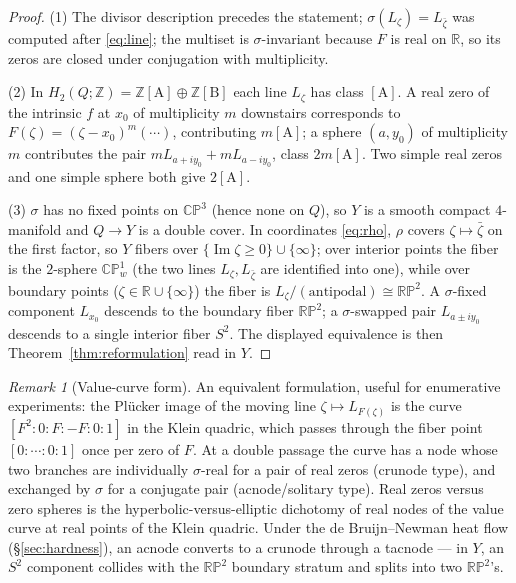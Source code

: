 \documentclass[11pt]{amsart}
\theoremstyle{plain}
\theoremstyle{definition}
\theoremstyle{remark}
\newtheorem{remark}[theorem]{Remark}
\newcommand{\RR}{\mathbb{R}}
\newcommand{\ZZ}{\mathbb{Z}}
\newcommand{\CP}{\mathbb{CP}}
\newcommand{\RP}{\mathbb{RP}}
\newcommand{\im}{\operatorname{Im}}
\begin{document}
\begin{proof}
(1) The divisor description precedes the statement; $\sigma(L_\zeta)=L_{\bar\zeta}$ was computed
after \eqref{eq:line}; the multiset is $\sigma$-invariant because $F$ is real on $\RR$, so its
zeros are closed under conjugation with multiplicity.

(2) In $H_2(Q;\ZZ)=\ZZ[\text{A}]\oplus\ZZ[\text{B}]$ each line $L_\zeta$ has class $[\text{A}]$. A
real zero of the intrinsic $f$ at $x_0$ of multiplicity $m$ downstairs corresponds to
$F(\zeta)=(\zeta-x_0)^m(\cdots)$, contributing $m[\text{A}]$; a sphere $(a,y_0)$ of multiplicity
$m$ contributes the pair $mL_{a+iy_0}+mL_{a-iy_0}$, class $2m[\text{A}]$. Two simple real zeros and
one simple sphere both give $2[\text{A}]$.

(3) $\sigma$ has no fixed points on $\CP^3$ (hence none on $Q$), so $Y$ is a smooth compact
$4$-manifold and $Q\to Y$ is a double cover. In coordinates \eqref{eq:rho}, $\rho$ covers
$\zeta\mapsto\bar\zeta$ on the first factor, so $Y$ fibers over
$\{\im\zeta\ge0\}\cup\{\infty\}$; over interior points the fiber is the $2$-sphere $\CP^1_w$ (the
two lines $L_\zeta,L_{\bar\zeta}$ are identified into one), while over boundary points
($\zeta\in\RR\cup\{\infty\}$) the fiber is $L_\zeta/(\text{antipodal})\cong\RP^2$. A
$\sigma$-fixed component $L_{x_0}$ descends to the boundary fiber $\RP^2$; a $\sigma$-swapped pair
$L_{a\pm iy_0}$ descends to a single interior fiber $S^2$. The displayed equivalence is then
Theorem~\ref{thm:reformulation} read in $Y$.
\end{proof}

\begin{remark}[Value-curve form]\label{rem:valuecurve}
An equivalent formulation, useful for enumerative experiments: the Pl\"ucker image of the moving
line $\zeta\mapsto L_{F(\zeta)}$ is the curve $[F^2:0:F:-F:0:1]$ in the Klein quadric, which
passes through the fiber point $[0:\cdots:0:1]$ once per zero of $F$. At a double passage the
curve has a node whose two branches are individually $\sigma$-real for a pair of real zeros
(crunode type), and exchanged by $\sigma$ for a conjugate pair (acnode/solitary type). Real zeros
versus zero spheres is the hyperbolic-versus-elliptic dichotomy of real nodes of the value curve
at real points of the Klein quadric. Under the de Bruijn--Newman heat flow (\S\ref{sec:hardness}),
an acnode converts to a crunode through a tacnode --- in $Y$, an $S^2$ component collides with the
$\RP^2$ boundary stratum and splits into two $\RP^2$'s.
\end{remark}
\end{document}
